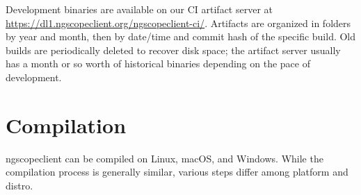 Development binaries are available on our CI artifact server at \url{https://dl1.ngscopeclient.org/ngscopeclient-ci/}. Artifacts are organized in folders by year and month, then by date/time and commit hash of the specific build. Old builds are periodically deleted to recover disk space; the artifact server usually has a month or so worth of historical binaries depending on the pace of development.

\section{Compilation}

ngscopeclient can be compiled on Linux, macOS, and Windows. While the compilation process is generally similar, various
steps differ among platform and distro.

